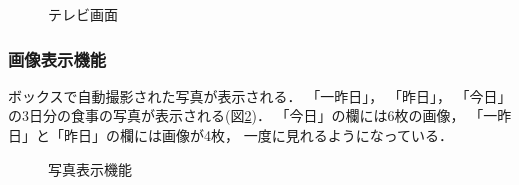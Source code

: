 \documentclass[../report]{subfiles}
\begin{document}
\begin{figure}[htbp]
    \begin{center}
        \caption{テレビ画面}
        \label{fig:5_tv-all}
    \end{center}
\end{figure}

\subsubsection{画像表示機能}
ボックスで自動撮影された写真が表示される．
「一昨日」， 「昨日」， 「今日」の3日分の食事の写真が表示される(図\ref{fig:5_tv-days})．
「今日」の欄には6枚の画像， 「一昨日」と「昨日」の欄には画像が4枚， 一度に見れるようになっている．

\begin{figure}[htbp]
    \begin{center}
        \caption{写真表示機能}
        \label{fig:5_tv-days}
    \end{center}
\end{figure}
\end{document}
